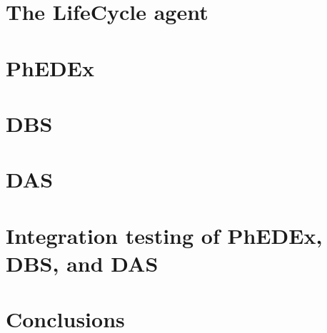 \documentclass[a4paper]{jpconf}
\begin{document}
\section{The LifeCycle agent}


\section{PhEDEx}


\section{DBS}


\section{DAS}


\section{Integration testing of PhEDEx, DBS, and DAS}


\section{Conclusions}


\par

\end{document}
